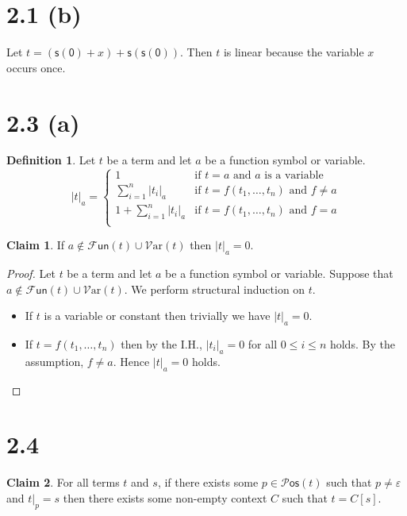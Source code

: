 \documentclass[autodetect-engine]{article}
\title{}
\author{}
\date{}
\newcommand{\FF}{\mathcal{F}}
\newcommand{\Var}{\mathcal{V}\mathrm{ar}}
\theoremstyle{plain}
\theoremstyle{definition}
\newtheorem*{definition*}{Definition}
\theoremstyle{definition}
\newtheorem*{claim}{Claim}
\newcommand{\m}[1]{\mathsf{#1}}
\newcommand{\Fun}{\FF\mathsf{un}}
\begin{document}
\section*{2.1 (b)}

Let $t = (\m{s}(\m{0}) + x) + \m{s}(\m{s}(\m{0}))$.
Then $t$ is linear because the variable $x$ occurs once.

\section*{2.3 (a)}

\begin{definition*}
    Let $t$ be a term and let $a$ be a function symbol or variable.
    \[
        |t|_a = \begin{cases}
            1 & \text{if $t = a$ and $a$ is a variable}\\
            \sum\limits_{i = 1}^n |t_i|_a & \text{if $t = f(t_1,\dots,t_n)$ and $f \neq a$}\\
            1 + \sum\limits_{i = 1}^n |t_i|_a & \text{if $t = f(t_1,\dots,t_n)$ and $f = a$}\\
        \end{cases}
    \]
\end{definition*}

\begin{claim}
    If $a \notin \Fun(t) \cup \Var(t)$ then $|t|_a = 0$.
\end{claim}

\begin{proof}
    Let $t$ be a term and let $a$ be a function symbol or variable.
    Suppose that $a \notin \Fun(t) \cup \Var(t)$.
    We perform structural induction on $t$.
    \begin{itemize}
        \item If $t$ is a variable or constant then trivially we have $|t|_a = 0$. 
        \item If $t = f(t_1,\dots,t_n)$ then by the I.H., $|t_i|_a = 0$ for all $0 \leq i \leq n$ holds.
              By the assumption, $f \neq a$. Hence $|t|_a = 0$ holds.
    \end{itemize}
\end{proof}

\newcommand{\Pos}{\mathcal{P}\mathsf{os}}

\section*{2.4}

\begin{claim}
    For all terms $t$ and $s$,
    if there exists some $p \in \Pos(t)$ such that $p \neq \varepsilon$ and $t|_p = s$ then
    there exists some non-empty context $C$ such that $t = C[s]$.
\end{claim}
\end{document}
